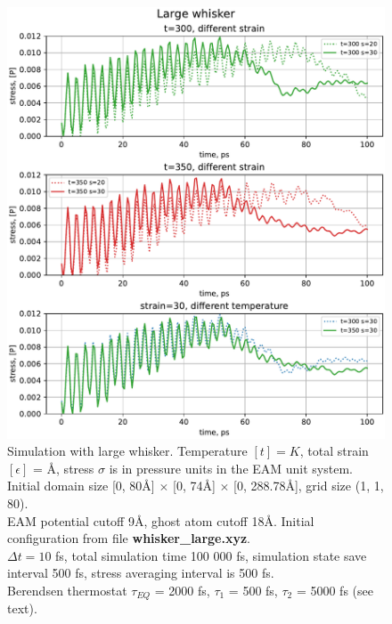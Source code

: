 \documentclass[12pt,a4paper]{article}
\begin{document}
\begin{figure}[h!]
	\centering
	\includegraphics[width=.95\linewidth]{img/milestone09-large.pdf}
	\caption{Simulation with large whisker. Temperature $[t]=K$, total strain $[\epsilon]$ = Å, stress $\sigma$ is in pressure units in the EAM unit system.\\
		Initial domain size [0, 80Å] $\times$ [0, 74Å] $\times$ [0, 288.78Å], grid size (1, 1, 80).\\
		EAM potential cutoff 9Å, ghost atom cutoff 18Å. Initial configuration from file {\bf whisker\_large.xyz}.\\
		$\Delta t = 10$ fs, total simulation time 100 000 fs, simulation state save interval 500 fs, stress averaging interval is 500 fs.\\
		Berendsen thermostat $\tau_{EQ}$ = 2000 fs, $\tau_1$ = 500 fs, $\tau_2$ = 5000 fs (see text).
	}
	\label{fig:whisker-large}
\end{figure}
\end{document}

